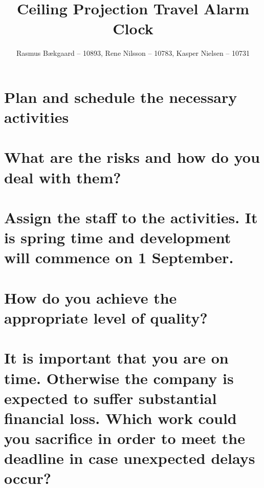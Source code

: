\documentclass[10pt, a4]{article}
\title{Ceiling Projection Travel Alarm Clock}
\author{Rasmus Bækgaard -- 10893, Rene Nilsson -- 10783, Kasper Nielsen -- 10731}
\begin{document}
\maketitle

\label{cha:Ceiling}

\section{Plan and schedule the necessary activities} 



\section{What are the risks and how do you deal with them?}
\section{Assign the staff to the activities. It is spring time and development will commence on
1 September.}
\section{How do you achieve the appropriate level of quality?}
\section{It is important that you are on time. Otherwise the company is expected to suffer substantial financial loss. Which work could you sacrifice in order to meet the deadline in case unexpected delays occur?}
\end{document}
